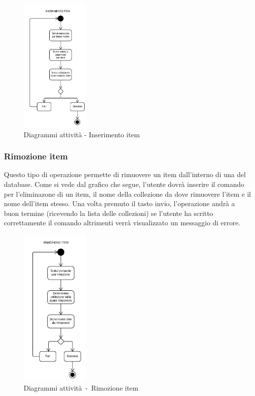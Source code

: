 \documentclass{scalatekids-article}
\begin{document}
\begin{figure}[H]
  \begin{center}
    \includegraphics[width=0.3\textwidth, keepaspectratio]{img/diagrammiAttivita/inserimentoItem.jpeg}
    \caption{Diagrammi attività - Inserimento item}
  \end{center}
\end{figure}

\subsubsection{Rimozione item}

Questo tipo di operazione permette di rimuovere un item dall'interno di una
 del database. Come si vede dal grafico che segue, l'utente
dovrà inserire il comando per l'eliminazone di un item, il nome della
collezione da dove rimuovere l'item e il nome dell'item stesso. Una volta
premuto il tasto invio, l'operazione andrà a buon termine (ricevendo la lista
delle collezioni) se l'utente ha scritto correttamente il comando altrimenti
verrà visualizzato un messaggio di errore.

\begin{figure}[H]
  \begin{center}
    \includegraphics[width=0.3\textwidth, keepaspectratio]{img/diagrammiAttivita/rimozioneItem.jpeg}
    \caption{Diagrammi attività\ -\ Rimozione item}
  \end{center}
\end{figure}
\end{document}
